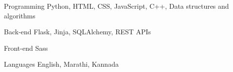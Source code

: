 

\begin{cvskills}

  \cvskill
    {Programming} %
    {Python, HTML, CSS, JavaScript, C++, Data structures and algorithms} %

  \cvskill
    {Back-end} %
    {Flask, Jinja, SQLAlchemy, REST APIs} %

  \cvskill
    {Front-end} %
    {Sass} %


  \cvskill
    {Languages} %
    {English, Marathi, Kannada} %

\end{cvskills}
